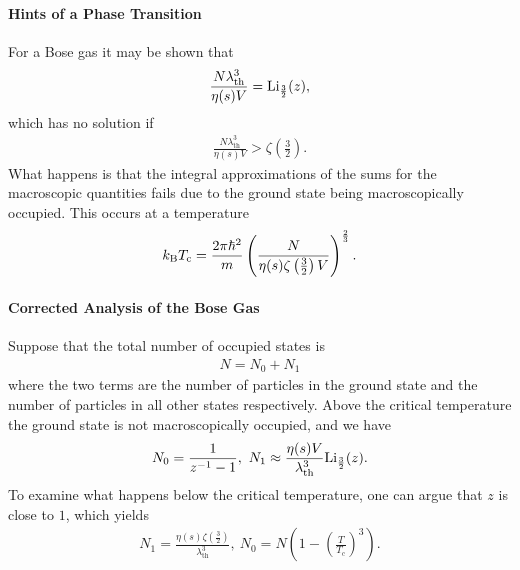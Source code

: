 \paragraph{Hints of a Phase Transition}
For a Bose gas it may be shown that
\begin{align*}
	\frac{N\lambda_{\text{th}}^{3}}{\eta(s)V} = \text{Li}_{\frac{3}{2}}(z),
\end{align*}
which has no solution if
\begin{align*}
	\frac{N\lambda_{\text{th}}^{3}}{\eta(s)V} > \zeta\left(\frac{3}{2}\right).
\end{align*}
What happens is that the integral approximations of the sums for the macroscopic quantities fails due to the ground state being macroscopically occupied. This occurs at a temperature
\begin{align*}
	k_{\text{B}} T_{\text{c}} = \frac{2\pi\hbar^{2}}{m}\left(\frac{N}{\eta(s)\zeta\left(\frac{3}{2}\right)V}\right)^{\frac{2}{3}}.
\end{align*}

\paragraph{Corrected Analysis of the Bose Gas}
Suppose that the total number of occupied states is
\begin{align*}
	N = N_{0} + N_{1}
\end{align*}
where the two terms are the number of particles in the ground state and the number of particles in all other states respectively. Above the critical temperature the ground state is not macroscopically occupied, and we have
\begin{align*}
	N_{0} = \frac{1}{z^{-1} - 1},\ N_{1} \approx \frac{\eta(s)V}{\lambda_{\text{th}}^{3}}\text{Li}_{\frac{3}{2}}(z).
\end{align*}
To examine what happens below the critical temperature, one can argue that $z$ is close to $1$, which yields
\begin{align*}
	N_{1} = \frac{\eta(s)\zeta\left(\frac{3}{2}\right)}{\lambda_{\text{th}}^{3}},\ N_{0} = N\left(1 - \left(\frac{T}{T_{\text{c}}}\right)^{3}\right).
\end{align*}

